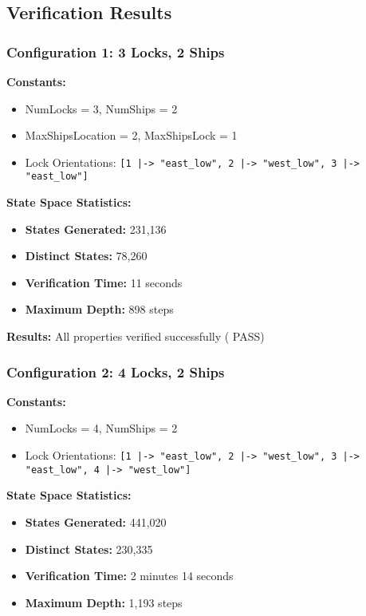 \documentclass[12pt,a4paper]{article}
\begin{document}
\subsection{Verification Results}

\subsubsection{Configuration 1: 3 Locks, 2 Ships}

\textbf{Constants:}
\begin{itemize}
    \item NumLocks = 3, NumShips = 2
    \item MaxShipsLocation = 2, MaxShipsLock = 1
    \item Lock Orientations: \texttt{[1 |-> "east\_low", 2 |-> "west\_low", 3 |-> "east\_low"]}
\end{itemize}

\textbf{State Space Statistics:}
\begin{itemize}
    \item \textbf{States Generated:} 231,136
    \item \textbf{Distinct States:} 78,260
    \item \textbf{Verification Time:} 11 seconds
    \item \textbf{Maximum Depth:} 898 steps
\end{itemize}

\textbf{Results:} All properties verified successfully (\checkmark{} PASS)

\subsubsection{Configuration 2: 4 Locks, 2 Ships}

\textbf{Constants:}
\begin{itemize}
    \item NumLocks = 4, NumShips = 2
    \item Lock Orientations: \texttt{[1 |-> "east\_low", 2 |-> "west\_low", 3 |-> "east\_low", 4 |-> "west\_low"]}
\end{itemize}

\textbf{State Space Statistics:}
\begin{itemize}
    \item \textbf{States Generated:} 441,020
    \item \textbf{Distinct States:} 230,335
    \item \textbf{Verification Time:} 2 minutes 14 seconds
    \item \textbf{Maximum Depth:} 1,193 steps
\end{itemize}
\end{document}
